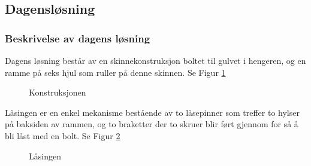 \subsection{Dagensløsning}
\subsubsection{Beskrivelse av dagens løsning}

Dagens løsning består av en skinnekonstruksjon boltet til gulvet i hengeren, og en ramme på seks hjul som ruller på denne skinnen. Se Figur \ref{F1} 
\begin{figure}[h!]
\centering   
{}
\caption{Konstruksjonen}
\label{F1}
\end{figure}

Låsingen er en enkel mekanisme bestående av to låsepinner som treffer to hylser på baksiden av rammen, og to braketter der to skruer blir ført gjennom for så å bli låst med en bolt. Se Figur \ref{F2} 

\begin{figure}[h!]
\centering   
{}
\caption{Låsingen}
\label{F2}
\end{figure}

